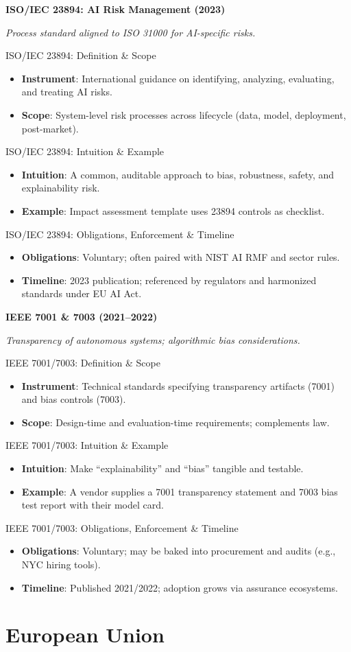 \documentclass[aspectratio=169]{beamer}
\newcommand{\RegTitle}[2]{%
  \begin{frame}[plain]
    \centering
    \vfill
    {\usebeamerfont{title}\usebeamercolor[fg]{title}\LARGE \textbf{#1}\par}
    \vspace{0.4em}
    {\small \itshape #2\par}
    \vfill
  \end{frame}
}
\newcommand{\RegDef}[2]{%
  \begin{frame}{#1: Definition \& Scope}
    \begin{itemize}
      #2
    \end{itemize}
  \end{frame}
}
\newcommand{\RegIntuition}[2]{%
  \begin{frame}{#1: Intuition \& Example}
    \begin{itemize}
      #2
    \end{itemize}
  \end{frame}
}
\newcommand{\RegCompliance}[2]{%
  \begin{frame}{#1: Obligations, Enforcement \& Timeline}
    \begin{itemize}
      #2
    \end{itemize}
  \end{frame}
}
\begin{document}
\RegTitle{ISO/IEC 23894: AI Risk Management (2023)}{Process standard aligned to ISO 31000 for AI-specific risks.}
\RegDef{ISO/IEC 23894}{%
  \item \textbf{Instrument}: International guidance on identifying, analyzing, evaluating, and treating AI risks.
  \item \textbf{Scope}: System-level risk processes across lifecycle (data, model, deployment, post-market).
}
\RegIntuition{ISO/IEC 23894}{%
  \item \textbf{Intuition}: A common, auditable approach to bias, robustness, safety, and explainability risk.
  \item \textbf{Example}: Impact assessment template uses 23894 controls as checklist.
}
\RegCompliance{ISO/IEC 23894}{%
  \item \textbf{Obligations}: Voluntary; often paired with NIST AI RMF and sector rules.
  \item \textbf{Timeline}: 2023 publication; referenced by regulators and harmonized standards under EU AI Act.
}

\RegTitle{IEEE 7001 \& 7003 (2021--2022)}{Transparency of autonomous systems; algorithmic bias considerations.}
\RegDef{IEEE 7001/7003}{%
  \item \textbf{Instrument}: Technical standards specifying transparency artifacts (7001) and bias controls (7003).
  \item \textbf{Scope}: Design-time and evaluation-time requirements; complements law.
}
\RegIntuition{IEEE 7001/7003}{%
  \item \textbf{Intuition}: Make ``explainability'' and ``bias'' tangible and testable.
  \item \textbf{Example}: A vendor supplies a 7001 transparency statement and 7003 bias test report with their model card.
}
\RegCompliance{IEEE 7001/7003}{%
  \item \textbf{Obligations}: Voluntary; may be baked into procurement and audits (e.g., NYC hiring tools).
  \item \textbf{Timeline}: Published 2021/2022; adoption grows via assurance ecosystems.
}

\section{European Union}
\end{document}
